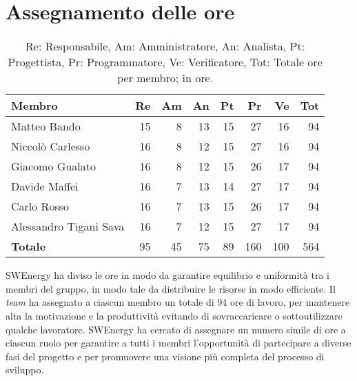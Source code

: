 \section{Assegnamento delle ore}

\begin{table}[H]
	\renewcommand{\arraystretch}{1.5}
	\centering
	\begin{tabular}{l|r|r|r|r|r|r|r}
		\textbf{Membro} & \textbf{Re} & \textbf{Am} & \textbf{An} & \textbf{Pt}
		& \textbf{Pr} & \textbf{Ve} & \textbf{Tot} \\
		\hline
		 Matteo Bando &				15 &  8 & 13 & 15 &  27 &  16 &  94	\\
		 Niccolò Carlesso &			16 &  8 & 12 & 15 &  27 &  16 &  94 \\
		 Giacomo Gualato &			16 &  8 & 12 & 15 &  26 &  17 &  94 \\
		 Davide Maffei	&			16 &  7 & 13 & 14 &  27 &  17 &  94 \\
		 Carlo Rosso &				16 &  7 & 13 & 15 &  26 &  17 &  94 \\
		 Alessandro Tigani Sava &	16 &  7 & 12 & 15 &  27 &  17 &  94 \\
		 \hline
		 \textbf{Totale} &			95 & 45 & 75 & 89 & 160 & 100 & 564 \\
	\end{tabular}

	\caption{Re: Responsabile, Am: Amministratore, An: Analista, Pt:
	Progettista, Pr: Programmatore, Ve: Verificatore, Tot: Totale ore per 
	membro; in ore.}
\end{table}

SWEnergy ha diviso le ore in modo da garantire equilibrio e uniformità tra i
membri del gruppo, in modo tale da distribuire le risorse in modo efficiente.
Il \textit{team} ha assegnato a ciascun membro un totale di 94 ore di lavoro,
per mantenere alta la motivazione e la produttività evitando di sovraccaricare o
sottoutilizzare qualche lavoratore.
SWEnergy ha cercato di assegnare un numero simile di ore a ciascun ruolo per
garantire a tutti i membri l'opportunità di partecipare a diverse fasi del
progetto e per promuovere una visione più completa del processo di sviluppo.
